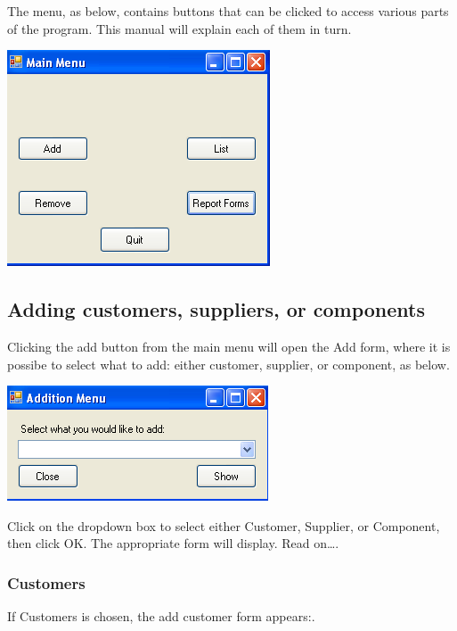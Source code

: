 	The menu, as below, contains buttons that can be clicked to access various parts of the program.  This manual will explain each of them in turn.
	
	\includegraphics[scale=0.5]{frmMainMenu_scrot}

	\subsection{Adding customers, suppliers, or components}
	
	Clicking the add button from the main menu will open the Add form, where it is possibe to select what to add: either customer, supplier, or component, as below.
	
	\includegraphics[scale=0.5]{frmAdd_scrot}
	
	Click on the dropdown box to select either Customer, Supplier, or Component, then click OK.  The appropriate form will display.  Read on\ldots.
	
		\subsubsection{Customers}
		
		If Customers is chosen, the add customer form appears:.
		
